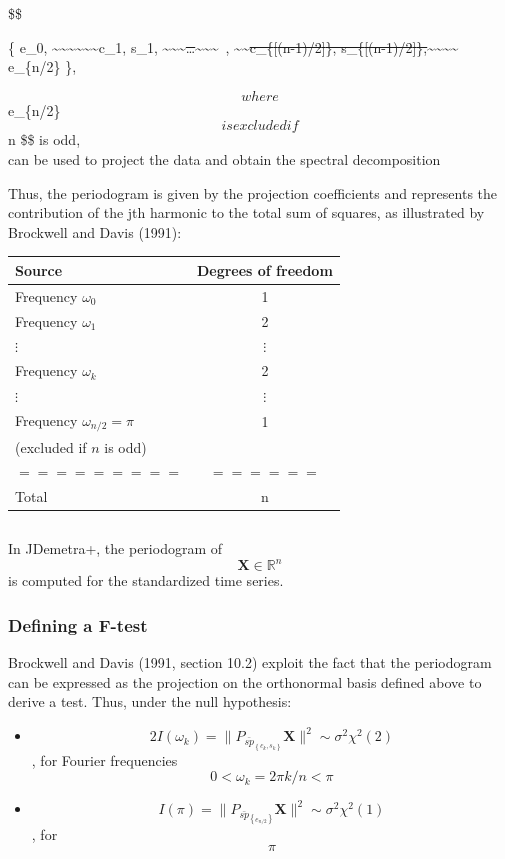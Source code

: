 \documentclass[
  letterpaper,
  DIV=11,
  numbers=noendperiod]{scrreprt}
\providecommand{\tightlist}{%
  \setlength{\itemsep}{0pt}\setlength{\parskip}{0pt}}\usepackage{longtable,booktabs,array}
\begin{document}
\$\$

\left\{ e\_0,
\textasciitilde\textasciitilde\textasciitilde\textasciitilde\textasciitilde\textasciitilde c\_1,
s\_1,
\textasciitilde\textasciitilde\textasciitilde{}\sout{\ldots}\textasciitilde\textasciitilde\textasciitilde~,
\textasciitilde\textasciitilde{}\sout{c\_\{{[}(n-1)/2{]}\},
s\_\{{[}(n-1)/2{]}\},}\textasciitilde\textasciitilde\textasciitilde\textasciitilde{}
e\_\{n/2\} \right\},

\[ where \] e\_\{n/2\} \[ is excluded if \] n \$\$ is odd,\\
can be used to project the data and obtain the spectral decomposition

Thus, the periodogram is given by the projection coefficients and
represents the contribution of the jth harmonic to the total sum of
squares, as illustrated by Brockwell and Davis (1991):

\begin{longtable}[]{@{}lc@{}}
\toprule()
Source & Degrees of freedom \\
\midrule()
\endhead
Frequency \( \omega_{0} \) & 1 \\
Frequency \( \omega_{1} \) & 2 \\
\( \vdots \) & \( \vdots \) \\
Frequency \( \omega_{k} \) & 2 \\
\( \vdots \) & \( \vdots \) \\
Frequency \( \omega_{n/2}=\pi \) & 1 \\
(excluded if \( n \) is odd) & \\
\( ========= \) & \( ====== \) \\
Total & n \\
\bottomrule()
\end{longtable}

\[~~~~\]

In JDemetra+, the periodogram of \[ \mathbf{X} \in \mathbb{R}^n \] is
computed for the standardized time series.

\hypertarget{defining-a-f-test}{%
\subsubsection{Defining a F-test}\label{defining-a-f-test}}

Brockwell and Davis (1991, section 10.2) exploit the fact that the
periodogram can be expressed as the projection on the orthonormal basis
defined above to derive a test. Thus, under the null hypothesis:

\begin{itemize}
\tightlist
\item
  \[ 2I(\omega_{k})= \| P_{\bar{sp}_{\left\{ c_{k},s_{k} \right\}}} \mathbf{X} \|^{2}  \sim \sigma^{2} \chi^{2}(2) \],
  for Fourier frequencies \[ 0 < \omega_{k}=2\pi k/n < \pi \]
\item
  \[ I(\pi)= \| P_{\bar{sp}_{\left\{ e_{n/2} \right\}}} \mathbf{X} \|^{2}  \sim \sigma^{2} \chi^{2}(1) \],
  for \[ \pi \]
\end{itemize}
\end{document}
